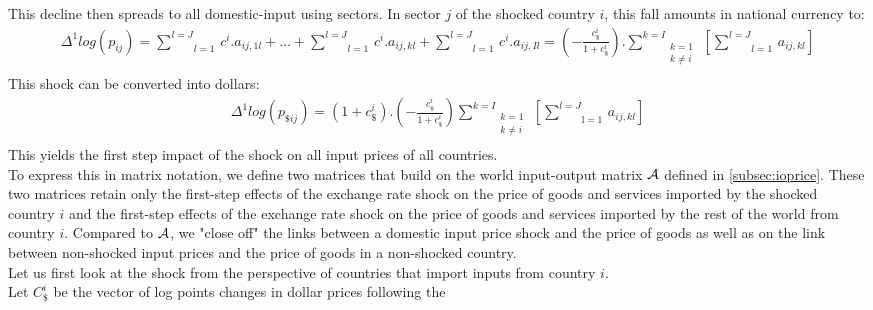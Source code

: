 \documentclass[12pt,a4paper]{paper}
\begin{document}
This decline then spreads to all domestic-input using sectors. In sector $j$ of the shocked country $i$, this fall amounts in national currency to: \\
\begin{eqnarray*}
\Delta^1log(p_{ij})=\underset{l=1}{\overset{l=J}{\mathop \sum}}\,c^i.a_{ij,1l}+\ldots +\underset{l=1}{\overset{{l}=J}{\mathop \sum }}\,c^i.a_{ij,kl}+\underset{l=1}{\overset{l={J}}{\mathop \sum }}\,c^i.{{a}_{ij,Il}}=\left( -\frac{c_\$^i}{1+c_\$^i}\right).\underset{\begin{matrix}k=1\\k\neq i\\\end{matrix}}{\overset{k=I}{\mathop\sum}}\,\left[\underset{l=1}{\overset{l=J}{\mathop\sum}}\,a_{ij,kl}\right] 
\end{eqnarray*}
This shock can be converted into dollars: \\
\begin{eqnarray}
\Delta^1 log(p_{\$ij})=\left(1+c_\$^i\right).\left(-\frac{c_\$^i}{1+c_\$^i}\right)\underset{\begin{matrix}k=1\\k\neq i\\\end{matrix}}{\overset{{k}={I}}{\mathop\sum}}\,\left[\underset{\text{l}=1}{\overset{{l}={J}}{\mathop\sum}}\,{{{a}}_{ij,kl}}\right] 
\label{eq:eq2}
\end{eqnarray}
This yields the first step impact of the shock on all input prices of all countries.\\
To express this in matrix notation, we define two matrices that build on the world input-output matrix $\cal A$ defined in \ref{subsec:ioprice}. 
These two matrices retain only the first-step effects of the exchange rate shock on the price of goods and services imported by the shocked country $i$ and the first-step effects of the exchange rate shock on the price of goods and services imported by the rest of the world from country $i$. 
Compared to $\cal A$, we "close off" the links between a domestic input price shock and the price of goods as well as on the link between non-shocked input prices and the price of goods in a non-shocked country.\\
Let us first look at the shock from the perspective of countries that import inputs from country $i$.\\
Let $C_\$^i$ be the vector of log points changes in dollar prices following the 
\end{document}
